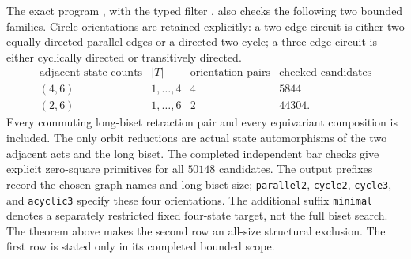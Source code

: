 \begin{remark}
\label{C:longer-circle-chart-controls}
The exact program , with the
typed filter , also
checks the following two bounded families.  Circle orientations
are retained explicitly: a two-edge circuit is either two
equally directed parallel edges or a directed two-cycle;
a three-edge circuit is either cyclically directed or
transitively directed.
\[
\begin{array}{c|c|c|r}
\text{adjacent state counts}&|T|&\text{orientation pairs}
 &\text{checked candidates}\\\hline
(4,6)&1,\ldots,4&4&5844\\
(2,6)&1,\ldots,6&2&44304.
\end{array}
\]
Every commuting long-biset retraction pair and every equivariant
composition is included.  The only orbit reductions are actual
state automorphisms of the two adjacent acts and the long biset.
The completed independent bar checks give explicit zero-square
primitives for all $50148$ candidates.  The output prefixes
 record the chosen graph
names and long-biset size; \texttt{parallel2}, \texttt{cycle2},
\texttt{cycle3}, and \texttt{acyclic3} specify these four
orientations.  The additional suffix \texttt{minimal} denotes
a separately restricted fixed four-state target, not the full
biset search.  The theorem above makes the second row an
all-size structural exclusion.  The first row is stated only
in its completed bounded scope.
\end{remark}
